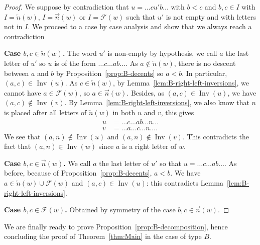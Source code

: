 \documentclass[Unicode]{cedram-alco}
\theoremstyle{definition}
\DeclareMathOperator{\invs}{Inv}
\newcommand{\R}{{\overrightarrow{n}}}
\newcommand{\LL}{{\overleftarrow{n}}}
\newcommand{\F}{\mathcal{F}}
\begin{document}
\begin{proof}
We suppose by contradiction that $u = \dots c u' b \dots$ with $b < c$ and $b,c \in I$ with  $I=\LL(w)$, $I=\R(w)$ or $I=\F(w)$ such that $u'$ is not empty and with letters not in $I$. We proceed to a case by case analysis and show that we always reach a contradiction



\textbf{Case $b,c \in \LL(w)$.}  The word $u'$ is non-empty by hypothesis, we call $a$ the last letter of $u'$ so $u$ is of the form $\dots c \dots a b \dots$. As $a \notin \LL(w)$, there is no descent between $a$ and $b$ by Proposition~\ref{prop:B-decents} so $a < b$. In particular, $(a,c) \in \invs(u)$. As $c \in \LL(w)$, by Lemma~\ref{lem:B-right-left-inversions}, we cannot have $a \in \F(w)$, so $a \in \R(w)$. Besides, as $(a,c) \in \invs(u)$, we have $(a,c) \not\in \invs(v)$. By Lemma~\ref{lem:B-right-left-inversions}, we also know that $n$ is placed after all letters of $\LL(w)$ in both $u$ and $v$, this gives
\begin{align*}
u &= \dots c \dots ab \dots n \dots \\
v &= \dots a \dots c \dots n \dots.
\end{align*}
We see that $(a,n) \not\in \invs(u)$ and $(a,n) \not\in \invs(v)$. This contradicts the fact that $(a,n)\in\invs(w)$ since $a$ is a right letter of $w$.



\textbf{Case $b,c \in \R(w)$.} We call $a$ the last letter of $u'$ so that $u = \dots c \dots ab \dots$. As before, because of Proposition~\ref{prop:B-decents}, $a<b$. We have $a \in \LL(w) \cup \F(w)$ and $(a,c) \in \invs(u)$: this contradicts Lemma~\ref{lem:B-right-left-inversions}.



\textbf{Case  $b,c \in \F(w)$.} Obtained by symmetry of the case $b,c \in \R(w)$. 
\end{proof}

We are finally ready to prove Proposition~\ref{prop:B-decomposition}, hence concluding the proof of Theorem~\ref{thm:Main} in the case of type $B$.
\end{document}
